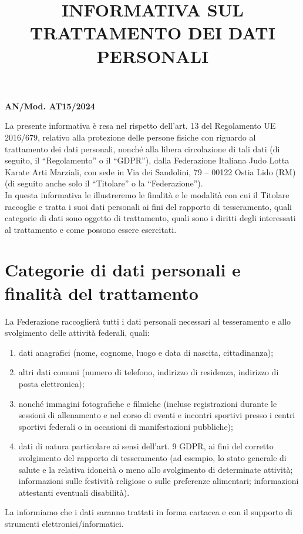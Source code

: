 \documentclass[
	twocolumn
]{djts}
\title{INFORMATIVA SUL TRATTAMENTO DEI DATI PERSONALI}
\makeatletter
\renewcommand{\maketitle}{%
	\begin{center}%
		\textbf{\large \@title}%
	\end{center}%
}
\makeatother
\begin{document}
	\fontsize{8pt}{9pt}\selectfont
	
	\begin{flushright}
		\textbf{AN/Mod. AT15/2024}
	\end{flushright}
	
	\maketitle
	
	La presente informativa è resa nel rispetto dell’art. 13 del Regolamento UE 2016/679, relativo alla protezione delle persone fisiche con riguardo al trattamento dei dati personali, nonché alla libera circolazione di tali dati (di seguito, il “Regolamento” o il “GDPR”), dalla Federazione Italiana Judo Lotta Karate Arti Marziali, con sede in Via dei Sandolini, 79 – 00122 Ostia Lido (RM) (di seguito anche solo il “Titolare” o la “Federazione”). \\
	In questa informativa le illustreremo le finalità e le modalità con cui il Titolare raccoglie e tratta i suoi dati personali ai fini del rapporto di tesseramento, quali categorie di dati sono oggetto di trattamento, quali sono i diritti degli interessati al trattamento e come possono essere esercitati.
	
	\section{Categorie di dati personali e finalità del trattamento}
	La Federazione raccoglierà tutti i dati personali necessari al tesseramento e allo svolgimento delle attività federali, quali:
	\begin{enumerate}[label=\alph{*}.]
		\item dati anagrafici (nome, cognome, luogo e data di nascita, cittadinanza);
		\item altri dati comuni (numero di telefono, indirizzo di residenza, indirizzo di posta elettronica);
		\item nonché immagini fotografiche e filmiche (incluse registrazioni durante le sessioni di allenamento e nel corso di eventi e incontri sportivi presso i centri sportivi federali o in occasioni di manifestazioni pubbliche);
		\item dati di natura particolare ai sensi dell’art. 9 GDPR, ai fini del corretto svolgimento del rapporto di tesseramento (ad esempio, lo stato generale di salute e la relativa idoneità o meno allo svolgimento di determinate attività; informazioni sulle festività religiose o sulle preferenze alimentari; informazioni attestanti eventuali disabilità).
	\end{enumerate}
	La informiamo che i dati saranno trattati in forma cartacea e con il supporto di strumenti elettronici/informatici.
	
\end{document}
